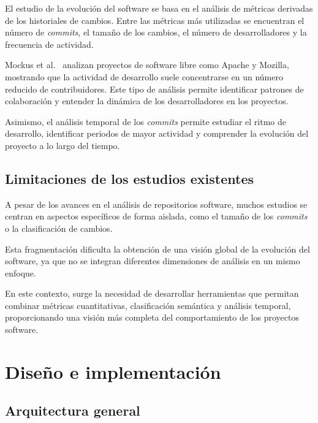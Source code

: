 \documentclass[a4paper, 12pt]{book}
\begin{document}
El estudio de la evolución del software se basa en el análisis de métricas derivadas de los historiales de cambios. Entre las métricas más utilizadas se encuentran el número de \emph{commits}, el tamaño de los cambios, el número de desarrolladores y la frecuencia de actividad.

Mockus et al.~\cite{mockus2002two} analizan proyectos de software libre como Apache y Mozilla, mostrando que la actividad de desarrollo suele concentrarse en un número reducido de contribuidores. Este tipo de análisis permite identificar patrones de colaboración y entender la dinámica de los desarrolladores en los proyectos.

Asimismo, el análisis temporal de los \emph{commits} permite estudiar el ritmo de desarrollo, identificar periodos de mayor actividad y comprender la evolución del proyecto a lo largo del tiempo.

\section{Limitaciones de los estudios existentes}
\label{sec:limitaciones}

A pesar de los avances en el análisis de repositorios software, muchos estudios se centran en aspectos específicos de forma aislada, como el tamaño de los \emph{commits} o la clasificación de cambios.

Esta fragmentación dificulta la obtención de una visión global de la evolución del software, ya que no se integran diferentes dimensiones de análisis en un mismo enfoque.

En este contexto, surge la necesidad de desarrollar herramientas que permitan combinar métricas cuantitativas, clasificación semántica y análisis temporal, proporcionando una visión más completa del comportamiento de los proyectos software.



\cleardoublepage
\chapter{Diseño e implementación}
\label{sec:diseno}


\section{Arquitectura general} 
\label{sec:arquitectura}
\end{document}
